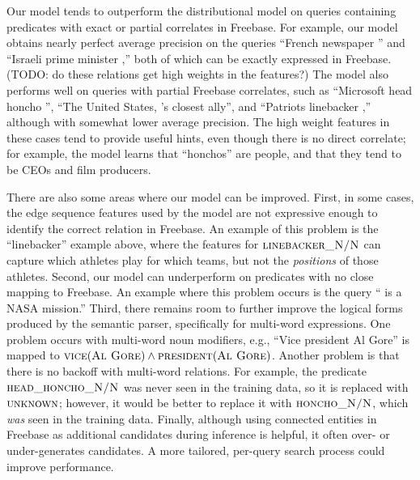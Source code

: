 \documentclass[11pt]{article}
\newcommand{\blank}{\underline{\hspace{.5cm}}}
\newcommand{\predicate}[1]{\ensuremath{\textsc{#1}}}
\newcommand{\entity}[1]{\ensuremath{\textsc{#1}}}
\begin{document}
Our model tends to outperform the distributional model on queries
containing predicates with exact or partial correlates in
Freebase. For example, our model obtains nearly perfect average
precision on the queries ``French newspaper \blank{}'' and ``Israeli
prime minister \blank{},'' both of which can be exactly expressed in
Freebase. (TODO: do these relations get high weights in the features?)
The model also performs well on queries with partial Freebase
correlates, such as ``Microsoft head honcho \blank{}'', ``The United
States, \blank{}'s closest ally'', and ``Patriots linebacker
\blank{},'' although with somewhat lower average precision. The high
weight features in these cases tend to provide useful hints, even
though there is no direct correlate; for example, the model learns
that ``honchos'' are people, and that they tend to be CEOs and film
producers.

There are also some areas where our model can be improved. First, in
some cases, the edge sequence features used by the model are not
expressive enough to identify the correct relation in Freebase. An
example of this problem is the ``linebacker'' example above, where the
features for \predicate{linebacker\_N/N} can capture which athletes
play for which teams, but not the \emph{positions} of those
athletes. Second, our model can underperform on predicates with no
close mapping to Freebase. An example where this problem occurs is the
query ``\blank{} is a NASA mission.'' Third, there remains room to
further improve the logical forms produced by the semantic parser,
specifically for multi-word expressions. One problem occurs with
multi-word noun modifiers, e.g., ``Vice president Al Gore'' is mapped
to $\predicate{vice}(\entity{Al Gore}) \land
\predicate{president}(\entity{Al Gore})$. Another problem is that
there is no backoff with multi-word relations. For example, the
predicate \predicate{head\_honcho\_N/N} was never seen in the training
data, so it is replaced with \predicate{unknown}; however, it would be
better to replace it with \predicate{honcho\_N/N}, which \emph{was}
seen in the training data. Finally, although using connected entities
in Freebase as additional candidates during inference is helpful, it
often over- or under-generates candidates. A more tailored, per-query
search process could improve performance.
\end{document}
